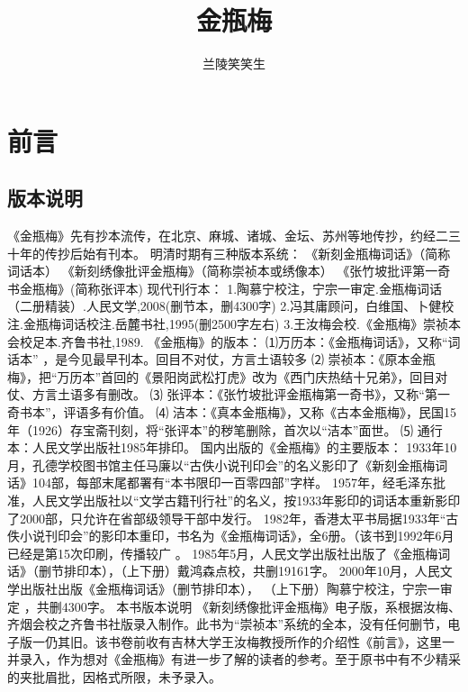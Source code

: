 \documentclass[a4paper,12pt,UTF8,twoside]{ctexbook}
\title{\heiti\zihao{0} 金瓶梅}
\author{兰陵笑笑生}
\date{}
\begin{document}
\maketitle
\tableofcontents

\frontmatter
\chapter{前言}

\section{版本说明}
《金瓶梅》先有抄本流传，在北京、麻城、诸城、金坛、苏州等地传抄，约经二三十年的传抄后始有刊本。
明清时期有三种版本系统：
《新刻金瓶梅词话》（简称词话本）
《新刻绣像批评金瓶梅》（简称崇祯本或绣像本）
《张竹坡批评第一奇书金瓶梅》(简称张评本)
现代刊行本：
1.陶慕宁校注，宁宗一审定.金瓶梅词话（二册精装）.人民文学,2008(删节本，删4300字)
2.冯其庸顾问，白维国、卜健校注.金瓶梅词话校注.岳麓书社,1995(删2500字左右)
3.王汝梅会校.《金瓶梅》崇祯本会校足本.齐鲁书社,1989.
《金瓶梅》的版本：
⑴万历本：《金瓶梅词话》，又称“词话本” ，是今见最早刊本。回目不对仗，方言土语较多
⑵ 崇祯本：《原本金瓶梅》，把“万历本”首回的《景阳岗武松打虎》改为《西门庆热结十兄弟》，回目对仗、方言土语多有删改。
⑶ 张评本：《张竹坡批评金瓶梅第一奇书》，又称“第一奇书本”，评语多有价值。
⑷ 洁本：《真本金瓶梅》，又称《古本金瓶梅》，民国15年（1926）存宝斋刊刻，将“张评本”的秽笔删除，首次以“洁本”面世。
⑸ 通行本：人民文学出版社1985年排印。
国内出版的《金瓶梅》的主要版本：
1933年10 月，孔德学校图书馆主任马廉以“古佚小说刊印会”的名义影印了《新刻金瓶梅词话》104部，每部末尾都署有“本书限印一百零四部”字样。
1957年，经毛泽东批准，人民文学出版社以“文学古籍刊行社”的名义，按1933年影印的词话本重新影印了2000部，只允许在省部级领导干部中发行。
1982年，香港太平书局据1933年“古佚小说刊印会”的影印本重印，书名为《金瓶梅词话》，全6册。（该书到1992年6月已经是第15次印刷，传播较广 。
1985年5月，人民文学出版社出版了《金瓶梅词话》（删节排印本），（上下册）戴鸿森点校，共删19161字。
2000年10月，人民文学出版社出版《金瓶梅词话》（删节排印本）， （上下册）陶慕宁校注，宁宗一审定 ，共删4300字。
本书版本说明
《新刻绣像批评金瓶梅》电子版，系根据汝梅、齐烟会校之齐鲁书社版录入制作。此书为“崇祯本”系统的全本，没有任何删节，电子版一仍其旧。该书卷前收有吉林大学王汝梅教授所作的介绍性《前言》，这里一并录入，作为想对《金瓶梅》有进一步了解的读者的参考。至于原书中有不少精采的夹批眉批，因格式所限，未予录入。
\end{document}
